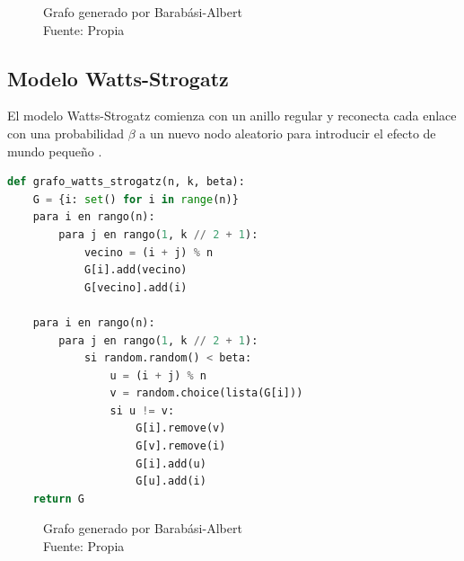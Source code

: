 \begin{figure}[h]
\caption{Grafo generado por Barabási-Albert\\Fuente: Propia}
\end{figure}


\subsection{Modelo Watts-Strogatz}

El modelo Watts-Strogatz comienza con un anillo regular y reconecta cada enlace con una probabilidad \( \beta \) a un nuevo nodo aleatorio para introducir el efecto de mundo pequeño \citep{Watts1998} .

\begin{lstlisting}[language=Python]
def grafo_watts_strogatz(n, k, beta):
    G = {i: set() for i in range(n)}
    para i en rango(n):
        para j en rango(1, k // 2 + 1):
            vecino = (i + j) % n
            G[i].add(vecino)
            G[vecino].add(i)

    para i en rango(n):
        para j en rango(1, k // 2 + 1):
            si random.random() < beta:
                u = (i + j) % n
                v = random.choice(lista(G[i]))
                si u != v:
                    G[i].remove(v)
                    G[v].remove(i)
                    G[i].add(u)
                    G[u].add(i)
    return G
\end{lstlisting}
\begin{figure}[h]
\caption{Grafo generado por Barabási-Albert\\Fuente: Propia}
\end{figure}

